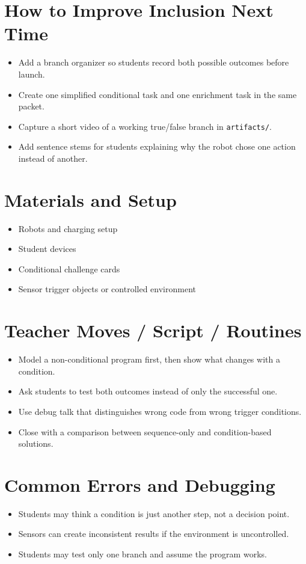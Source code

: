 \documentclass[11pt]{article}
\begin{document}
\section*{How to Improve Inclusion Next Time}
\begin{itemize}[leftmargin=*]
\item Add a branch organizer so students record both possible outcomes before launch.
\item Create one simplified conditional task and one enrichment task in the same packet.
\item Capture a short video of a working true/false branch in \texttt{artifacts/}.
\item Add sentence stems for students explaining why the robot chose one action instead of another.
\end{itemize}

\section*{Materials and Setup}
\begin{itemize}[leftmargin=*]
\item Robots and charging setup
\item Student devices
\item Conditional challenge cards
\item Sensor trigger objects or controlled environment
\end{itemize}

\section*{Teacher Moves / Script / Routines}
\begin{itemize}[leftmargin=*]
\item Model a non-conditional program first, then show what changes with a condition.
\item Ask students to test both outcomes instead of only the successful one.
\item Use debug talk that distinguishes wrong code from wrong trigger conditions.
\item Close with a comparison between sequence-only and condition-based solutions.
\end{itemize}

\section*{Common Errors and Debugging}
\begin{itemize}[leftmargin=*]
\item Students may think a condition is just another step, not a decision point.
\item Sensors can create inconsistent results if the environment is uncontrolled.
\item Students may test only one branch and assume the program works.
\end{itemize}
\end{document}
